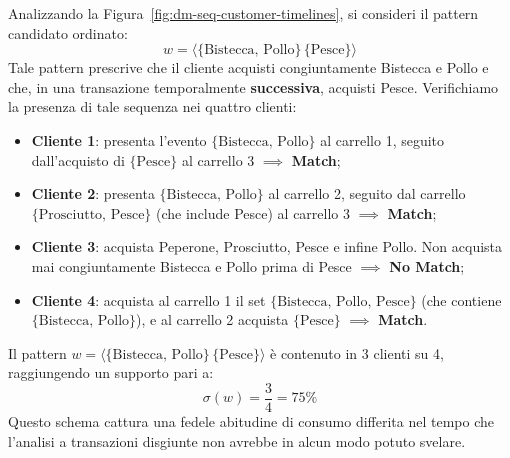 Analizzando la Figura~\ref{fig:dm-seq-customer-timelines}, si consideri il pattern candidato ordinato:
\begin{equation}
\label{eq:seq-candidate-steak-fish}
w = \langle \{\text{Bistecca, Pollo}\} \, \{\text{Pesce}\} \rangle
\end{equation}
Tale pattern prescrive che il cliente acquisti congiuntamente Bistecca e Pollo e che, in una transazione temporalmente \textbf{successiva}, acquisti Pesce.
Verifichiamo la presenza di tale sequenza nei quattro clienti:
\begin{itemize}
    \item \textbf{Cliente 1}: presenta l'evento $\{\text{Bistecca, Pollo}\}$ al carrello 1, seguito dall'acquisto di $\{\text{Pesce}\}$ al carrello 3 $\implies$ \textbf{Match};
    \item \textbf{Cliente 2}: presenta $\{\text{Bistecca, Pollo}\}$ al carrello 2, seguito dal carrello $\{\text{Prosciutto, Pesce}\}$ (che include Pesce) al carrello 3 $\implies$ \textbf{Match};
    \item \textbf{Cliente 3}: acquista Peperone, Prosciutto, Pesce e infine Pollo. Non acquista mai congiuntamente Bistecca e Pollo prima di Pesce $\implies$ \textbf{No Match};
    \item \textbf{Cliente 4}: acquista al carrello 1 il set $\{\text{Bistecca, Pollo, Pesce}\}$ (che contiene $\{\text{Bistecca, Pollo}\}$), e al carrello 2 acquista $\{\text{Pesce}\}$ $\implies$ \textbf{Match}.
\end{itemize}

Il pattern $w = \langle \{\text{Bistecca, Pollo}\} \, \{\text{Pesce}\} \rangle$ è contenuto in 3 clienti su 4, raggiungendo un supporto pari a:
\begin{equation}
\sigma(w) = \frac{3}{4} = 75\%
\end{equation}
Questo schema cattura una fedele abitudine di consumo differita nel tempo che l'analisi a transazioni disgiunte non avrebbe in alcun modo potuto svelare.

\FloatBarrier
